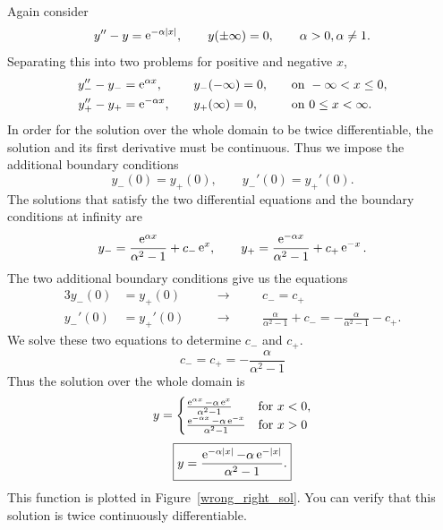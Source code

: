 \begin{Example}
  Again consider
  \[ 
  y'' - y = \mathop{\mathrm{e}}\nolimits^{-\alpha |x|}, \qquad y(\pm \infty) = 0, \qquad \alpha > 0, \alpha \neq 1. 
  \]
  Separating this into two problems for positive and negative $x$,
  \begin{alignat*}{3}
    y_-'' - y_- &= \mathop{\mathrm{e}}\nolimits^{\alpha x}, &\quad &y_-(-\infty) = 0, &\quad &\mathrm{on}\ -\infty < x \leq 0, \\
    y_+'' - y_+ &= \mathop{\mathrm{e}}\nolimits^{-\alpha x}, &\quad &y_+(\infty)=0, &\quad &\mathrm{on}\ 0\leq x < \infty.
  \end{alignat*}
  In order for the solution over the whole domain to be twice
  differentiable, the solution and its first derivative must be
  continuous.  Thus we impose the additional boundary conditions
  \[ 
  y_-(0) = y_+(0), \qquad y_-'(0) = y_+'(0). 
  \]
  The solutions that satisfy the two differential equations and the 
  boundary conditions at infinity are
  \[ 
  y_- = \frac{\mathop{\mathrm{e}}\nolimits^{\alpha x}}{\alpha^2-1} + c_- \mathop{\mathrm{e}}\nolimits^x, \qquad
  y_+ = \frac{\mathop{\mathrm{e}}\nolimits^{-\alpha x}}{\alpha^2-1} + c_+ \mathop{\mathrm{e}}\nolimits^{-x}. 
  \]
  The two additional boundary conditions give us the equations
  \begin{alignat*}{3}
    y_-(0) &= y_+(0) &\quad &\to &\quad &c_- = c_+ \\
    y_-'(0) &= y_+'(0) &\quad &\to &\quad &\frac{\alpha}{\alpha^2-1} + c_- = 
    -\frac{\alpha}{\alpha^2-1} - c_+.
  \end{alignat*}
  We solve these two equations to determine $c_-$ and $c_+$.
  \[ 
  c_- = c_+ = - \frac{\alpha}{\alpha^2-1}
  \]
  Thus the solution over the whole domain is
  \[ 
  y =  \begin{cases}
    \frac{\e^{\alpha x} - \alpha \e^x }{\alpha^2-1} &\mathrm{for}\ x < 0, \\
    \frac{\e^{-\alpha x}-\alpha \e^{-x}}{\alpha^2-1} &\mathrm{for}\ x > 0
  \end{cases}
  \]
  \[ 
  \boxed{ 
    y = \frac{\mathop{\mathrm{e}}\nolimits^{-\alpha |x|} - \alpha \mathop{\mathrm{e}}\nolimits^{-|x|}}{\alpha^2-1}. 
    }
  \]
  This function is plotted in Figure~\ref{wrong_right_sol}.
  You can verify that this solution is twice continuously differentiable.
\end{Example}














